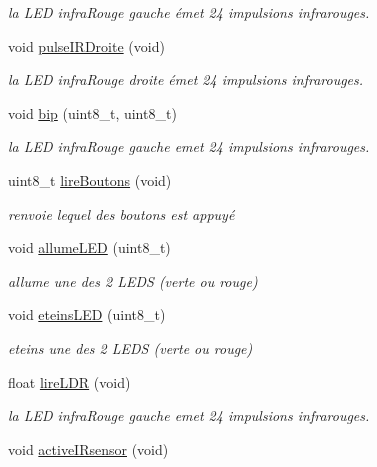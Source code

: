 \begin{DoxyCompactItemize}
\begin{DoxyCompactList}\small\item\em la L\-E\-D infra\-Rouge gauche émet 24 impulsions infrarouges. \end{DoxyCompactList}\item 
\hypertarget{class_d_f_robot2_w_d_add2e75d46648d2f96fcdc0637799ae57}{void \hyperlink{class_d_f_robot2_w_d_add2e75d46648d2f96fcdc0637799ae57}{pulse\-I\-R\-Droite} (void)}\label{class_d_f_robot2_w_d_add2e75d46648d2f96fcdc0637799ae57}

\begin{DoxyCompactList}\small\item\em la L\-E\-D infra\-Rouge droite émet 24 impulsions infrarouges. \end{DoxyCompactList}\item 
void \hyperlink{class_d_f_robot2_w_d_a00c24b6d6be83474b4406c69601693e0}{bip} (uint8\-\_\-t, uint8\-\_\-t)
\begin{DoxyCompactList}\small\item\em la L\-E\-D infra\-Rouge gauche emet 24 impulsions infrarouges. \end{DoxyCompactList}\item 
uint8\-\_\-t \hyperlink{class_d_f_robot2_w_d_ace376163144bc9e11e27f705b99b1a33}{lire\-Boutons} (void)
\begin{DoxyCompactList}\small\item\em renvoie lequel des boutons est appuyé \end{DoxyCompactList}\item 
void \hyperlink{class_d_f_robot2_w_d_a30c9122f26bc5274b024acde8df84be8}{allume\-L\-E\-D} (uint8\-\_\-t)
\begin{DoxyCompactList}\small\item\em allume une des 2 L\-E\-D\-S (verte ou rouge) \end{DoxyCompactList}\item 
void \hyperlink{class_d_f_robot2_w_d_a0fa86146871d65dee79a75052ac8903f}{eteins\-L\-E\-D} (uint8\-\_\-t)
\begin{DoxyCompactList}\small\item\em eteins une des 2 L\-E\-D\-S (verte ou rouge) \end{DoxyCompactList}\item 
float \hyperlink{class_d_f_robot2_w_d_a52586a7e4f934475d35da9527d0ac197}{lire\-L\-D\-R} (void)
\begin{DoxyCompactList}\small\item\em la L\-E\-D infra\-Rouge gauche emet 24 impulsions infrarouges. \end{DoxyCompactList}\item 
\hypertarget{class_d_f_robot2_w_d_a660f6d3e3f0aad9732c6a68512fcb8b1}{void \hyperlink{class_d_f_robot2_w_d_a660f6d3e3f0aad9732c6a68512fcb8b1}{active\-I\-Rsensor} (void)}\label{class_d_f_robot2_w_d_a660f6d3e3f0aad9732c6a68512fcb8b1}


\end{DoxyCompactItemize}
